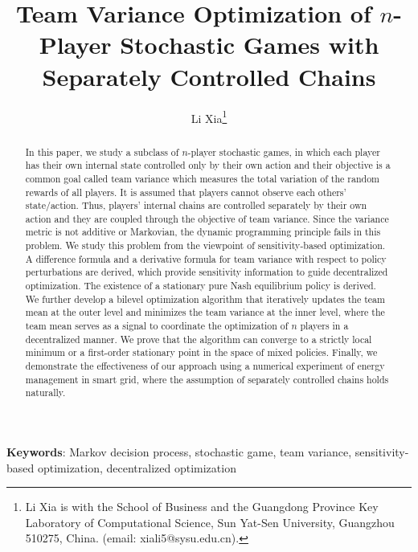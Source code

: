 \documentclass[12pt]{article}
\title{\vspace{-2cm} Team Variance Optimization of $n$-Player Stochastic Games with Separately Controlled Chains}
\author{Li Xia\thanks{Li Xia is with the School of Business and the Guangdong Province Key Laboratory of Computational Science, Sun Yat-Sen University, Guangzhou 510275, China. (email: xiali5@sysu.edu.cn).}}
\date{}
\begin{document}
\maketitle

\begin{abstract}
In this paper, we study a subclass of $n$-player stochastic games,
in which each player has their own internal state controlled only by
their own action and their objective is a common goal called team
variance which measures the total variation of the random rewards of
all players. It is assumed that players cannot observe each others'
state/action. Thus, players' internal chains are controlled
separately by their own action and they are coupled through the
objective of team variance. Since the variance metric is not
additive or Markovian, the dynamic programming principle fails in
this problem. We study this problem from the viewpoint of
sensitivity-based optimization. A difference formula and a
derivative formula for team variance with respect to policy
perturbations are derived, which provide sensitivity information to
guide decentralized optimization. The existence of a stationary pure
Nash equilibrium policy is derived. We further develop a bilevel
optimization algorithm that iteratively updates the team mean at the
outer level and minimizes the team variance at the inner level,
where the team mean serves as a signal to coordinate the
optimization of $n$ players in a decentralized manner. We prove that
the algorithm can converge to a strictly local minimum or a
first-order stationary point in the space of mixed policies.
Finally, we demonstrate the effectiveness of our approach using a
numerical experiment of energy management in smart grid, where the
assumption of separately controlled chains holds naturally.

%


\end{abstract}

\textbf{Keywords}: Markov decision process, stochastic game, team
variance, sensitivity-based optimization, decentralized optimization
\end{document}
